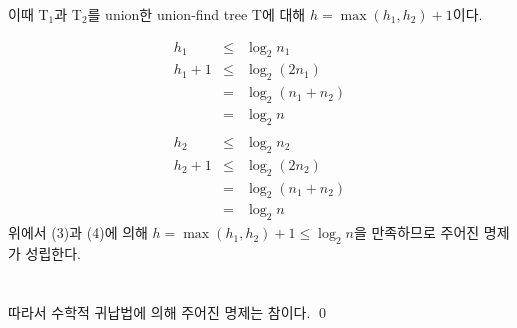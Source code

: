 \documentclass[a4page, 11pt]{article}
\begin{document}
이때 T$_1$과 T$_2$를 union한 union-find tree T에 대해 $h = \max(h_1, h_2) + 1$이다.

\begin{eqnarray}
h_1 &\leq& \log_2{n_1} \nonumber \\
h_1 + 1 &\leq& \log_2{(2n_1)} \nonumber \\
&=& \log_2{(n_1 + n_2)} \nonumber \\
&=& \log_2{n}\\
\nonumber \\
h_2 &\leq& \log_2{n_2} \nonumber \\
h_2 + 1 &\leq& \log_2{(2n_2)} \nonumber \\
&=& \log_2{(n_1 + n_2)} \nonumber \\
&=& \log_2{n}
\end{eqnarray}
위에서 (3)과 (4)에 의해 $h=\max(h_1, h_2) + 1 \leq \log_2{n}$을 만족하므로 주어진 명제가 성립한다.
\\
\\
\\
따라서 수학적 귀납법에 의해 주어진 명제는 참이다. \qed
\end{document}

